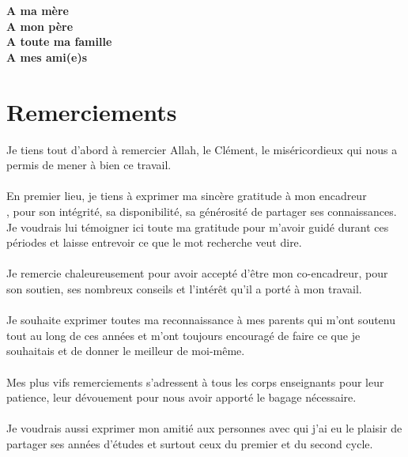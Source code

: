 \chapter*{}
\vspace{4mm}

\begin{flushright}
	\large
	\textbf{
		A ma mère \\
		A mon père \\
		A toute ma famille\\ A mes ami(e)s
	} 
\end{flushright}

\vspace{8mm}
\chapter*{Remerciements}
Je tiens tout d’abord à remercier Allah, le Clément, le miséricordieux qui nous a permis de mener à bien ce travail.
\\\\
En premier lieu, je tiens à exprimer ma sincère gratitude à mon encadreur\\ \textbf{\saidouni{}}, pour son intégrité, sa disponibilité, sa générosité de partager ses connaissances. Je voudrais lui témoigner ici toute ma gratitude pour m'avoir guidé durant ces périodes et laisse entrevoir ce que le mot recherche veut dire.
\\\\
Je remercie chaleureusement \textbf{\bouneb{}} pour avoir accepté d'être mon co-encadreur, pour son soutien, ses nombreux conseils et l'intérêt qu'il a porté à mon travail.
\\\\
Je souhaite exprimer toutes ma reconnaissance à mes parents qui m'ont soutenu tout au long de ces années et m'ont toujours encouragé de faire ce que je souhaitais et de donner le meilleur de moi-même. 
\\\\
Mes plus vifs remerciements s’adressent à tous les corps enseignants pour leur patience, leur dévouement pour nous avoir apporté le bagage nécessaire.
\\\\
Je voudrais aussi exprimer mon amitié aux personnes avec qui j'ai eu le plaisir de partager ses années d'études et surtout ceux du premier et du second cycle.

